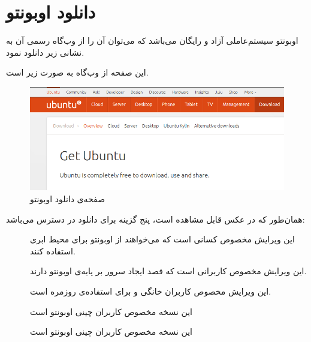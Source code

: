 \chapter{دانلود اوبونتو}
اوبونتو سیستم‌عاملی آزاد و رایگان می‌باشد که می‌توان آن را از وب‌گاه رسمی آن به نشانی زیر دانلود نمود.

\begin{url-address}

\end{url-address}
 این صفحه از وب‌گاه به صورت زیر است.
\begin{figure}[hbtp]
\centering
\includegraphics[scale=0.5]{pics/ubuntu-download.png}
\caption{صفحه‌ی دانلود اوبونتو}
\label{fig:ubuntu-download}
\end{figure}

همان‌طور که در عکس قابل مشاهده است، پنج گزینه برای دانلود در دسترس می‌باشد:
\begin{description}
\item[] این ویرایش مخصوص کسانی است که می‌خواهند از اوبونتو برای محیط ابری استفاده کنند.
\item[] این ویرایش مخصوص کاربرانی است که قصد ایجاد سرور بر پایه‌ی اوبونتو دارند.
\item[] این ویرایش مخصوص کاربران خانگی و برای استفاده‌ی روزمره است.
\item[] این نسخه مخصوص کاربران چینی اوبونتو است
\item[] این نسخه مخصوص کاربران چینی اوبونتو است
\end{description}